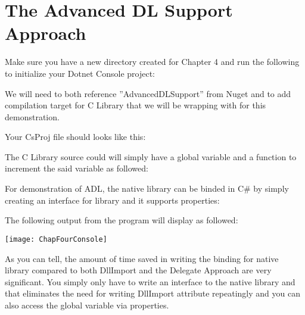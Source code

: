 \newpage
\section{The Advanced DL Support Approach}
Make sure you have a new directory created for Chapter 4 and run the following to initialize your Dotnet Console project:



We will need to both reference ''AdvancedDLSupport'' from Nuget and to add compilation target for C Library that we will be wrapping with for this demonstration.

Your CsProj file should looks like this:



The C Library source could will simply have a global variable and a function to increment the said variable as followed:



For demonstration of ADL, the native library can be binded in C\# by simply creating an interface for library and it supports properties:


\newpage
The following output from the program will display as followed:

\texttt{[image: ChapFourConsole]}

As you can tell, the amount of time saved in writing the binding for native library compared to both DllImport and the Delegate Approach are very significant. You simply only have to write an interface to the native library and that eliminates the need for writing DllImport attribute repeatingly and you can also access the global variable via properties.

